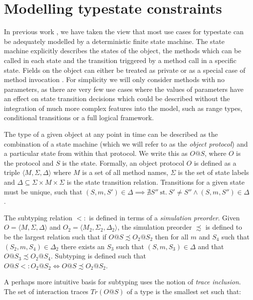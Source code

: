 \documentclass[preprint]{sigplanconf}
\newcommand{\Tr}{\mathit{Tr}}
\begin{document}
\section{Modelling typestate constraints}
\label{sec:tsmodel}

In previous work \cite{McGinniss2011}, we have taken the view that most use 
cases for typestate can be adequately modelled by a deterministic
finite state machine. The state machine explicitly describes the
states of the object, the methods which can be called in each state and
the transition triggered by a method call in a specific state.
Fields on the object can either be treated as private or as a special case
of method invocation \cite{Abadi1996}. For simplicity
we will only consider methods with no parameters, as there are very few
use cases where the values of parameters have an effect on state transition 
decisions which could be described without the integration of much more
complex features into the model, such as range types, conditional transitions
or a full logical framework.

The type of a given object at any point in time can be described as the
combination of a state machine (which we will refer to as the 
{\it object protocol}) and a particular state from within that protocol.
We write this as $O@S$, where $O$ is the protocol and $S$ is the state.
Formally, an object protocol $O$ is defined as a triple
$\langle M, \Sigma, \Delta \rangle$ where $M$ is a set of all
method names, $\Sigma$ is the set of state labels and
$\Delta \subseteq \Sigma \times M \times \Sigma$ is the state
transition relation. Transitions for a given state must be unique, such that 
$(S, m, S') \in \Delta \implies \nexists S'' \:\mathrm{st.}\: S' \neq S'' 
\wedge (S, m, S'') \in \Delta$.

The subtyping relation $<:$ is defined in terms of a
{\it simulation preorder}. Given $O = \langle M, \Sigma, \Delta \rangle$ and
$O_2 = \langle M_2, \Sigma_2, \Delta_2 \rangle$, the simulation preorder
$\precsim$
is defined to be the largest relation such that if $O@S \precsim O_2@S_2$ then for all
$m$ and $S_4$ such that $(S_2, m, S_4) \in \Delta_2$ there exists an $S_3$ such that
$(S, m, S_3) \in \Delta$ and that $O@S_3 \precsim O_2@S_4$.
Subtyping is defined such that $O@S <: O_2@S_2 \iff O@S \precsim O_2@S_2$.

A perhaps more intuitive basis for subtyping
uses the notion of {\it trace inclusion}. The set of interaction traces 
$\Tr(O@S)$ of a type is the smallest set such that:
\end{document}
